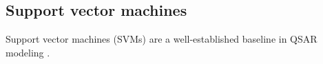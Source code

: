 \subsection{Support vector machines}

Support vector machines (SVMs) are a well-established baseline in QSAR modeling \citep{Vapnik1995, Svetnik2003}.

